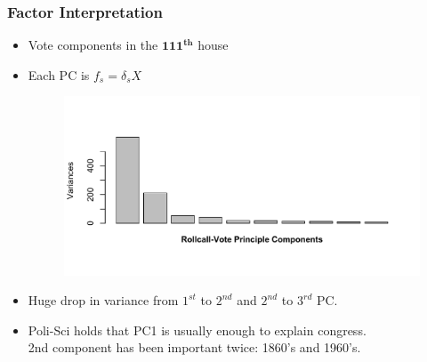 \documentclass[
  shownotes,
  xcolor={svgnames},
  hyperref={colorlinks,citecolor=DarkBlue,linkcolor=DarkRed,urlcolor=DarkBlue}
  , aspectratio=169]{beamer}
\newcommand{\sg}{\color{DarkSlateGray}}
\newcommand{\bs}[1]{\boldsymbol{#1}}
\begin{document}
\begin{frame}[fragile]
\frametitle{Factor Interpretation}

\begin{itemize}

  \item Vote components in the $\bs{111^{th}}$ house
 
 \item Each PC is $f_s = \delta_s X$ 

  \begin{figure}[H] \centering
            \captionsetup{justification=centering}
              \includegraphics[scale=0.5]{figures/VOTEscree}
              
 \end{figure}

\item Huge drop in variance from $1^{st}$ to $2^{nd}$ and  $2^{nd}$ to $3^{rd}$ PC.
\item Poli-Sci holds that PC1 is usually enough to explain congress. \\\sg 2nd component has been important twice: 1860's and 1960's.

\end{itemize}


\end{frame}
\end{document}
